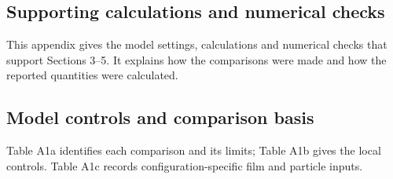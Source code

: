 \documentclass[12pt]{article}
\begin{document}
\endgroup
\clearpage\ESBappendix
\renewcommand{\thefigure}{\thesection\arabic{figure}}
\renewcommand{\thetable}{\thesection\arabic{table}}
\renewcommand{\theHtable}{\thetable}
\begin{landscape}
\section{Supporting calculations and numerical checks}\label{appendix-a.-supporting-calculations-and-numerical-checks}

\begingroup\footnotesize{}
This appendix gives the model settings, calculations and numerical checks that support Sections 3--5. It explains how the comparisons were made and how the reported quantities were calculated.

\subsection{Model controls and comparison basis}\label{a.1.-model-controls-and-comparison-basis}

Table A1a identifies each comparison and its limits; Table A1b gives the local controls. Table A1c records configuration-specific film and particle inputs.
\endgroup


\end{landscape}
\end{document}
